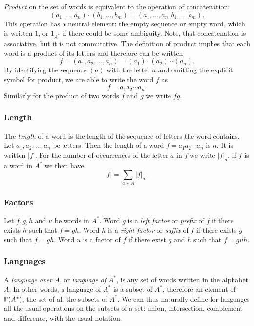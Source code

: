 \emph{Product} on the set of words is equivalent to the operation of concatenation:
\[
    (a_1, \dotsc, a_n) \cdot (b_1, \dotsc, b_m) = (a_1, \dotsc, a_n, b_1, \dotsc, b_m).
\]
This operation has a neutral element: the empty sequence or empty word, which is written $1$, or $1_{A^*}$ if there could be some ambiguity. Note, that concatenation is associative, but it is not commutative. The definition of product implies that each word is a product of its letters and therefore can be written
\[
    f = (a_1, a_2, \dotsc, a_n) = (a_1) \cdot (a_2) \dotsm (a_n).
\]
By identifying the sequence $(a)$ with the letter $a$ and omitting the explicit symbol for product, we are able to write the word $f$ as
\[
    f = a_1 a_2 \dotsm a_n.
\]
Similarly for the product of two words $f$ and $g$ we write $fg$.

\subsubsection*{Length}

The \emph{length} of a word is the length of the sequence of letters the word contains. Let $a_1, a_2, \dotsc, a_n$ be letters. Then the length of a word $f = a_1 a_2 \dotsm a_n$ is $n$. It is written $|f|$. For the number of occurrences of the letter $a$ in $f$ we write $|f|_a$. If $f$ is a word in $A^*$ we then have
\[
    |f| = \sum_{a \in A} |f|_a \; .
\]

\subsubsection*{Factors}

Let $f, g, h$ and $u$ be words in $A^*$. Word $g$ is a \emph{left factor} or \emph{prefix} of $f$ if there exists $h$ such that $f = g h$. Word $h$ is a \emph{right factor} or \emph{suffix} of $f$ if there exists $g$ such that $f = g h$. Word $u$ is a factor of $f$ if there exist $g$ and $h$ such that $f = g u h$.

\subsubsection*{Languages}

A \emph{language over $A$}, or \emph{language of $A^*$}, is any set of words written in the alphabet $A$. In other words, a language of $A^*$ is a subset of $A^*$, therefore an element of $\mathbb{P}(A^*)$, the set of all the subsets of $A^*$. We can thus naturally define for languages all the usual operations on the subsets of a set: union, intersection, complement and difference, with the usual notation.

